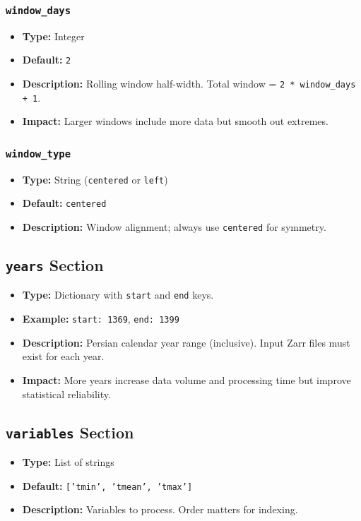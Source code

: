 \documentclass[12pt,a4paper]{article}
\begin{document}
\subsubsection{\texttt{window\_days}}
\begin{itemize}[leftmargin=*]
    \item \textbf{Type:} Integer
    \item \textbf{Default:} \texttt{2}
    \item \textbf{Description:} Rolling window half-width. Total window = \texttt{2 * window\_days + 1}.
    \item \textbf{Impact:} Larger windows include more data but smooth out extremes.
\end{itemize}

\subsubsection{\texttt{window\_type}}
\begin{itemize}[leftmargin=*]
    \item \textbf{Type:} String (\texttt{centered} or \texttt{left})
    \item \textbf{Default:} \texttt{centered}
    \item \textbf{Description:} Window alignment; always use \texttt{centered} for symmetry.
\end{itemize}

\subsection{\texttt{years} Section}
\begin{itemize}[leftmargin=*]
    \item \textbf{Type:} Dictionary with \texttt{start} and \texttt{end} keys.
    \item \textbf{Example:} \texttt{start: 1369}, \texttt{end: 1399}
    \item \textbf{Description:} Persian calendar year range (inclusive). Input Zarr files must exist for each year.
    \item \textbf{Impact:} More years increase data volume and processing time but improve statistical reliability.
\end{itemize}

\subsection{\texttt{variables} Section}
\begin{itemize}[leftmargin=*]
    \item \textbf{Type:} List of strings
    \item \textbf{Default:} \texttt{['tmin', 'tmean', 'tmax']}
    \item \textbf{Description:} Variables to process. Order matters for indexing.
\end{itemize}
\end{document}
